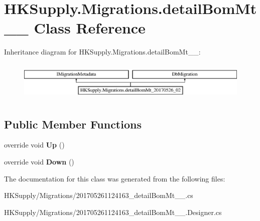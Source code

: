 \hypertarget{class_h_k_supply_1_1_migrations_1_1detail_bom_mt__20170526__02}{}\section{H\+K\+Supply.\+Migrations.\+detail\+Bom\+Mt\+\_\+\_ Class Reference}
\label{class_h_k_supply_1_1_migrations_1_1detail_bom_mt__20170526__02}
Inheritance diagram for H\+K\+Supply.\+Migrations.\+detail\+Bom\+Mt\+\_\+\_\+:\begin{figure}[H]
\begin{center}
\leavevmode
\includegraphics[height=1.898305cm]{class_h_k_supply_1_1_migrations_1_1detail_bom_mt__20170526__02}
\end{center}
\end{figure}
\subsection*{Public Member Functions}
\begin{DoxyCompactItemize}
\item 
\mbox{\label{class_h_k_supply_1_1_migrations_1_1detail_bom_mt__20170526__02_a751014e1dc3e03c2837c4f0467b99a89}} 
override void {\bfseries Up} ()
\item 
\mbox{\label{class_h_k_supply_1_1_migrations_1_1detail_bom_mt__20170526__02_a2cbf267f6f7c3453c1800b94653e3378}} 
override void {\bfseries Down} ()
\end{DoxyCompactItemize}


The documentation for this class was generated from the following files\+:\begin{DoxyCompactItemize}
\item 
H\+K\+Supply/\+Migrations/201705261124163\+\_\+detail\+Bom\+Mt\+\_\+\_.\+cs\item 
H\+K\+Supply/\+Migrations/201705261124163\+\_\+detail\+Bom\+Mt\+\_\+\_.\+Designer.\+cs\end{DoxyCompactItemize}
